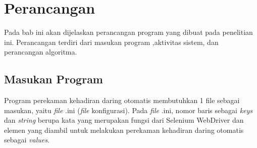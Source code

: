 \chapter{Perancangan}
\label{chap:perancangan}
Pada bab ini akan dijelaskan perancangan program yang dibuat pada penelitian ini. Perancangan terdiri dari masukan program ,aktivitas sistem, dan perancangan algoritma. 

\section{Masukan Program}
\label{sec:inputConfig} 
Program perekaman kehadiran daring otomatis membutuhkan 1 file sebagai masukan, yaitu \textit{file} .ini (\textit{file} konfigurasi). Pada \textit{file} .ini, nomor baris sebagai \textit{keys} dan \textit{string} berupa kata yang merupakan fungsi dari Selenium WebDriver dan elemen yang diambil untuk melakukan perekaman kehadiran daring otomatis sebagai \textit{values}. 

